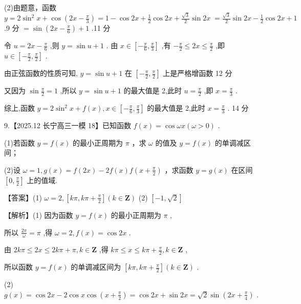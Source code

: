 \documentclass[10pt]{article}
\begin{document}
(2)由题意，函数 \(y = 2{\sin }^{2}x + \cos \left( {{2x} - \frac{\pi }{3}}\right)  = 1 - \cos {2x} + \frac{1}{2}\cos {2x} + \frac{\sqrt{3}}{2}\sin {2x} \; = \frac{\sqrt{3}}{2}\sin {2x} - \frac{1}{2}\cos {2x} + 1\) .9 分 \(= \sin \left( {{2x} - \frac{\pi }{6}}\right)  + 1\) .11 分

令 \(u = {2x} - \frac{\pi }{6}\) ,则 \(y = \sin u + 1\) . 由 \(x \in  \left\lbrack  {-\frac{\pi }{6},\frac{\pi }{3}}\right\rbrack\) ,有 \(- \frac{\pi }{2} \leq  {2x} \leq  \frac{\pi }{2}\) ,即 \(u \in  \left\lbrack  {-\frac{\pi }{2},\frac{\pi }{2}}\right\rbrack\) .

由正弦函数的性质可知, \(y = \sin u + 1\) 在 \(\left\lbrack  {-\frac{\pi }{2},\frac{\pi }{2}}\right\rbrack\) 上是严格增函数 12 分

又因为 \(\sin \frac{\pi }{2} = 1\) ,所以 \(y = \sin u + 1\) 的最大值是 2,此时 \(u = \frac{\pi }{2}\) ,即 \(x = \frac{\pi }{3}\) .

综上,函数 \(y = 2{\sin }^{2}x + f\left( x\right) ,x \in  \left\lbrack  {-\frac{\pi }{6},\frac{\pi }{3}}\right\rbrack\) 的最大值是 2,此时 \(x = \frac{\pi }{3}\) . 14 分

9.【2025.12 长宁高三一模 18】已知函数 \(f\left( x\right)  = \cos {\omega x}\left( {\omega  > 0}\right)\) .

(1)若函数 \(y = f\left( x\right)\) 的最小正周期为 \(\pi\) ，求 \(\omega\) 的值及 \(y = f\left( x\right)\) 的单调减区间；

(2)设 \(\omega  = 1,g\left( x\right)  = f\left( {2x}\right)  - {2f}\left( x\right) f\left( {x + \frac{\pi }{2}}\right)\) ，求函数 \(y = g\left( x\right)\) 在区间 \(\left\lbrack  {0,\frac{\pi }{2}}\right\rbrack\) 上的值域.

【答案】(1) \(\omega  = 2,\left\lbrack  {{k\pi },{k\pi } + \frac{\pi }{2}}\right\rbrack  \left( {k \in  \mathbf{Z}}\right)\) (2) \(\left\lbrack  {-1,\sqrt{2}}\right\rbrack\)

【解析】(1) 因为函数 \(y = f\left( x\right)\) 的最小正周期为 \(\pi\) ,

所以 \(\frac{2\pi }{\omega } = \pi\) ,得 \(\omega  = 2,f\left( x\right)  = \cos {2x}\) .

由 \({2k\pi } \leq  {2x} \leq  {2k\pi } + \pi ,k \in  \mathbf{Z}\) ,得 \({k\pi } \leq  x \leq  {k\pi } + \frac{\pi }{2},k \in  \mathbf{Z}\) ,

所以函数 \(y = f\left( x\right)\) 的单调减区间为 \(\left\lbrack  {{k\pi },{k\pi } + \frac{\pi }{2}}\right\rbrack  \left( {k \in  \mathbf{Z}}\right)\) .

(2) \(g\left( x\right)  = \cos {2x} - 2\cos x\cos \left( {x + \frac{\pi }{2}}\right)  = \cos {2x} + \sin {2x} = \sqrt{2}\sin \left( {{2x} + \frac{\pi }{4}}\right)\) .
\end{document}
